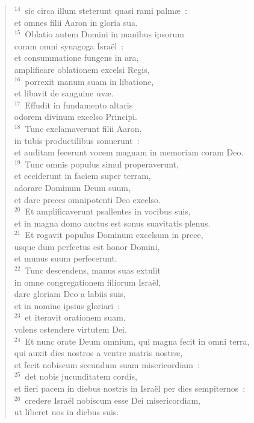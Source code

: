 \begin{verse}
${}^{14}$~sic circa illum steterunt quasi rami palm\ae~:\\ et omnes filii Aaron in gloria sua.\\
${}^{15}$~Oblatio autem Domini in manibus ipsorum\\ coram omni synagoga Isra\"el~:\\ et consummatione fungens in ara,\\ amplificare oblationem excelsi Regis,\\
${}^{16}$~porrexit manum suam in libatione,\\ et libavit de sanguine uv\ae .\\
${}^{17}$~Effudit in fundamento altaris\\ odorem divinum excelso Principi.\\
${}^{18}$~Tunc exclamaverunt filii Aaron,\\ in tubis productilibus sonuerunt~:\\ et auditam fecerunt vocem magnam in memoriam coram Deo.\\
${}^{19}$~Tunc omnis populus simul properaverunt,\\ et ceciderunt in faciem super terram,\\ adorare Dominum Deum suum,\\ et dare preces omnipotenti Deo excelso.\\
${}^{20}$~Et amplificaverunt psallentes in vocibus suis,\\ et in magna domo auctus est sonus suavitatis plenus.\\
${}^{21}$~Et rogavit populus Dominum excelsum in prece,\\ usque dum perfectus est honor Domini,\\ et munus suum perfecerunt.\\
${}^{22}$~Tunc descendens, manus suas extulit\\ in omne congregationem filiorum Isra\"el,\\ dare gloriam Deo a labiis suis,\\ et in nomine ipsius gloriari~:\\
${}^{23}$~et iteravit orationem suam,\\ volens ostendere virtutem Dei.\\
${}^{24}$~Et nunc orate Deum omnium, qui magna fecit in omni terra,\\ qui auxit dies nostros a ventre matris nostr\ae ,\\ et fecit nobiscum secundum suam misericordiam~:\\
${}^{25}$~det nobis jucunditatem cordis,\\ et fieri pacem in diebus nostris in Isra\"el per dies sempiternos~:\\
${}^{26}$~credere Isra\"el nobiscum esse Dei misericordiam,\\ ut liberet nos in diebus suis.\end{verse}


